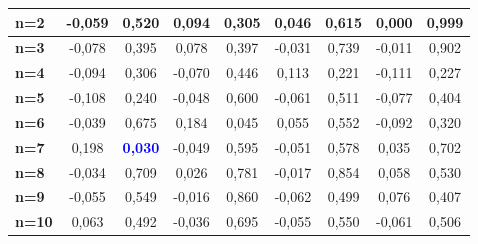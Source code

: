 \documentclass[10pt,twoside]{article}
\begin{document}
\begin{table}
\begin{center}
\begin{scriptsize}
\begin{tabular}{|l|c|c|c|c|c|c|c|c|}
    \textbf{n=2}  & -0,059 & 0,520          & 0,094  & 0,305          & 0,046  & 0,615 & 0,000  & 0,999 \\ \hline
    \textbf{n=3}  & -0,078 & 0,395          & 0,078  & 0,397          & -0,031 & 0,739 & -0,011 & 0,902 \\ \hline
    \textbf{n=4}  & -0,094 & 0,306          & -0,070 & 0,446          & 0,113  & 0,221 & -0,111 & 0,227 \\ \hline
    \textbf{n=5}  & -0,108 & 0,240          & -0,048 & 0,600          & -0,061 & 0,511 & -0,077 & 0,404 \\ \hline
    \textbf{n=6}  & -0,039 & 0,675          & 0,184  & 0,045            & 0,055  & 0,552 & -0,092 & 0,320 \\ \hline
    \textbf{n=7}  & 0,198  & \textcolor{blue}{\textbf{0,030}}          & -0,049 & 0,595          & -0,051 & 0,578 & 0,035  & 0,702 \\ \hline
    \textbf{n=8}  & -0,034 & 0,709          & 0,026  & 0,781          & -0,017 & 0,854 & 0,058  & 0,530 \\ \hline
    \textbf{n=9}  & -0,055 & 0,549          & -0,016 & 0,860          & -0,062 & 0,499 & 0,076  & 0,407 \\ \hline
    \textbf{n=10} & 0,063  & 0,492          & -0,036 & 0,695          & -0,055 & 0,550 & -0,061 & 0,506 \\ \hline
    
    \end{tabular}
    \begin{tabular}{|l|c|c|c|c|c|c|c|c|}

    
    

\end{tabular}
\end{scriptsize}
\end{center}
\end{table}
\end{document}
